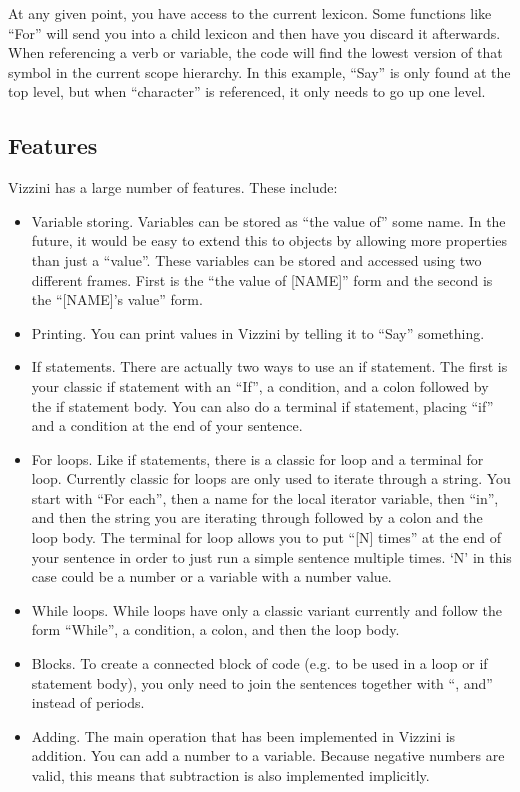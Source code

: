 \documentclass[titlepage]{article}
\newcommand{\langName}{Vizzini}
\begin{document}
At any given point, you have access to the current lexicon. Some functions like ``For'' will send you into a child lexicon and then have you discard it afterwards. When referencing a verb or variable, the code will find the lowest version of that symbol in the current scope hierarchy. In this example, ``Say'' is only found at the top level, but when ``character'' is referenced, it only needs to go up one level.

\subsection*{Features}
\langName{} has a large number of features. These include:
\begin{itemize}
	\item Variable storing. Variables can be stored as ``the value of'' some name. In the future, it would be easy to extend this to objects by allowing more properties than just a ``value''. These variables can be stored and accessed using two different frames. First is the ``the value of [NAME]'' form and the second is the ``[NAME]'s value'' form.
	\item Printing. You can print values in \langName{} by telling it to ``Say'' something.
	\item If statements. There are actually two ways to use an if statement. The first is your classic if statement with an ``If'', a condition, and a colon followed by the if statement body. You can also do a terminal if statement, placing ``if'' and a condition at the end of your sentence.
	\item For loops. Like if statements, there is a classic for loop and a terminal for loop. Currently classic for loops are only used to iterate through a string. You start with ``For each'', then a name for the local iterator variable, then ``in'', and then the string you are iterating through followed by a colon and the loop body. The terminal for loop allows you to put ``[N] times'' at the end of your sentence in order to just run a simple sentence multiple times. `N' in this case could be a number or a variable with a number value.
	\item While loops. While loops have only a classic variant currently and follow the form ``While'', a condition, a colon, and then the loop body.
	\item Blocks. To create a connected block of code (e.g. to be used in a loop or if statement body), you only need to join the sentences together with ``, and'' instead of periods.
	\item Adding. The main operation that has been implemented in \langName{} is addition. You can add a number to a variable. Because negative numbers are valid, this means that subtraction is also implemented implicitly.
\end{itemize}
\end{document}
